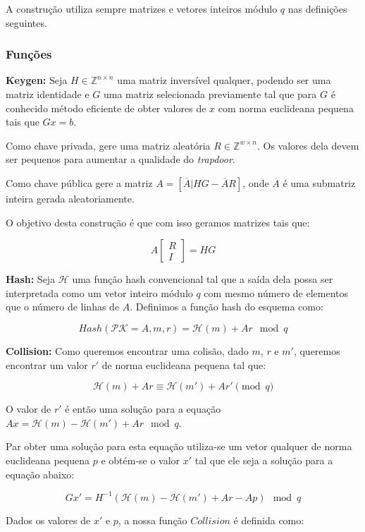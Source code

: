 \documentclass[a4paper]{article}
\begin{document}
A construção utiliza sempre matrizes e vetores inteiros módulo $q$ nas
definições seguintes.

\subsubsection{Funções}

\textbf{Keygen:} Seja $H \in \mathbb{Z}^{n\times n}$ uma matriz
inversível qualquer, podendo ser uma matriz identidade e $G$ uma
matriz selecionada previamente tal que para $G$ é conhecido método
eficiente de obter valores de $x$ com norma euclideana pequena tais
que $Gx = b$.

Como chave privada, gere uma matriz aleatória $R \in \mathbb{Z}^{w
  \times n}$. Os valores dela devem ser pequenos para aumentar a
qualidade do \textit{trapdoor}.

Como chave pública gere a matriz $A=[\overline{A}|HG-\overline{A}R]$,
onde $\overline{A}$ é uma submatriz inteira gerada aleatoriamente.

O objetivo desta construção é que com isso geramos matrizes tais que:

$$
A\left[\begin{matrix}R\\I\end{matrix}\right] = HG
$$

\textbf{Hash: } Seja $\mathcal{H}$ uma função hash convencional tal
que a saída dela possa ser interpretada como um vetor inteiro módulo
$q$ com mesmo número de elementos que o número de linhas de
$A$. Definimos a função hash do esquema como:

$$
Hash(\mathcal{PK}=A, m, r) = \mathcal{H}(m) + Ar \mod q
$$

\textbf{Collision: } Como queremos encontrar uma colisão, dado $m$,
$r$ e $m'$, queremos encontrar um valor $r'$ de norma euclideana
pequena tal que:

$$
\mathcal{H}(m) + Ar  \equiv \mathcal{H}(m') + Ar' \pmod q
$$

O valor de $r'$ é então uma solução para a equação $Ax =
\mathcal{H}(m) - \mathcal{H}(m') + Ar \mod q$.

Par obter uma solução para esta equação utiliza-se um vetor qualquer
de norma euclideana pequena $p$ e obtém-se o valor $x'$ tal que ele
seja a solução para a equação abaixo:

$$
Gx' = H^{-1}(\mathcal{H}(m) - \mathcal{H}(m') + Ar - Ap) \mod q
$$

Dados os valores de $x'$ e $p$, a nossa função $Collision$ é definida
como:
\end{document}
